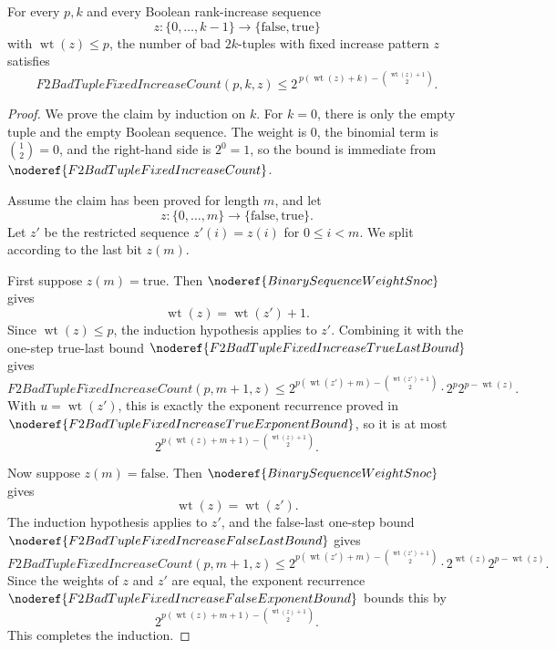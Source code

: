 \begin{helper}
For every \(p,k\) and every Boolean rank-increase sequence
\[
  z:\{0,\ldots,k-1\}\to\{\mathrm{false},\mathrm{true}\}
\]
with \(\operatorname{wt}(z)\le p\), the number of bad \(2k\)-tuples with fixed
increase pattern \(z\) satisfies
\[
  F2BadTupleFixedIncreaseCount(p,k,z)
  \le
  2^{\,p(\operatorname{wt}(z)+k)-\binom{\operatorname{wt}(z)+1}{2}}.
\]
\end{helper}
\begin{proof}
We prove the claim by induction on \(k\). For \(k=0\), there is only the empty
tuple and the empty Boolean sequence. The weight is \(0\), the binomial term is
\(\binom{1}{2}=0\), and the right-hand side is \(2^0=1\), so the bound is
immediate from \(\noderef{F2BadTupleFixedIncreaseCount}\).

Assume the claim has been proved for length \(m\), and let
\[
  z:\{0,\ldots,m\}\to\{\mathrm{false},\mathrm{true}\}.
\]
Let \(z'\) be the restricted sequence \(z'(i)=z(i)\) for \(0\le i<m\). We
split according to the last bit \(z(m)\).

First suppose \(z(m)=\mathrm{true}\). Then
\(\noderef{BinarySequenceWeightSnoc}\) gives
\[
  \operatorname{wt}(z)=\operatorname{wt}(z')+1.
\]
Since \(\operatorname{wt}(z)\le p\), the induction hypothesis applies to
\(z'\). Combining it with the one-step true-last bound
\(\noderef{F2BadTupleFixedIncreaseTrueLastBound}\) gives
\[
  F2BadTupleFixedIncreaseCount(p,m+1,z)
  \le
  2^{p(\operatorname{wt}(z')+m)-\binom{\operatorname{wt}(z')+1}{2}}
  \cdot 2^p 2^{p-\operatorname{wt}(z)}.
\]
With \(u=\operatorname{wt}(z')\), this is exactly the exponent recurrence
proved in \(\noderef{F2BadTupleFixedIncreaseTrueExponentBound}\), so it is at
most
\[
  2^{p(\operatorname{wt}(z)+m+1)-\binom{\operatorname{wt}(z)+1}{2}}.
\]

Now suppose \(z(m)=\mathrm{false}\). Then
\(\noderef{BinarySequenceWeightSnoc}\) gives
\[
  \operatorname{wt}(z)=\operatorname{wt}(z').
\]
The induction hypothesis applies to \(z'\), and the false-last one-step bound
\(\noderef{F2BadTupleFixedIncreaseFalseLastBound}\) gives
\[
  F2BadTupleFixedIncreaseCount(p,m+1,z)
  \le
  2^{p(\operatorname{wt}(z')+m)-\binom{\operatorname{wt}(z')+1}{2}}
  \cdot 2^{\operatorname{wt}(z)}2^{p-\operatorname{wt}(z)}.
\]
Since the weights of \(z\) and \(z'\) are equal, the exponent recurrence
\(\noderef{F2BadTupleFixedIncreaseFalseExponentBound}\) bounds this by
\[
  2^{p(\operatorname{wt}(z)+m+1)-\binom{\operatorname{wt}(z)+1}{2}}.
\]
This completes the induction.
\end{proof}
